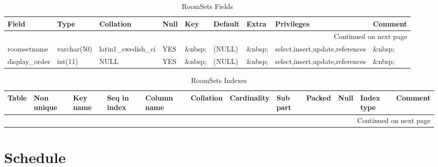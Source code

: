 \documentclass[tablesignature,landscape]{scrartcl}
\begin{document}
\begin{longtable}{|l|l|l|l|l|l|l|l|l|}
\caption{RoomSets Fields} \label{tbl:roomsetsfields}\\
\hline
 Field             &  Type         &  Collation                &  Null     &  Key      &  Default  &  Extra              &  Privileges                       &  Comment \\
\hline
\endhead
\hline\multicolumn{9}{r}{Continued on next page}\
\endfoot
\endlastfoot
\hline
 roomsetid         &  int(11)      &  NULL                     &  \&nbsp;  &  PRI      &  (NULL)   &  auto\_{}increment  &  select,insert,update,references  &  \&nbsp;  \\
 roomsetname       &  varchar(50)  &  latin1\_{}swedish\_{}ci  &  YES      &  \&nbsp;  &  (NULL)   &  \&nbsp;            &  select,insert,update,references  &  \&nbsp;  \\
 display\_{}order  &  int(11)      &  NULL                     &  YES      &  \&nbsp;  &  (NULL)   &  \&nbsp;            &  select,insert,update,references  &  \&nbsp;  \\
\hline
\end{longtable}


\begin{longtable}{|l|l|l|l|l|l|l|l|l|l|l|l|}
\caption{RoomSets Indexes} \label{tbl:roomsetsindexes}\\
\hline
 Table     &  Non unique  &  Key name  &  Seq in index  &  Column name  &  Collation  &  Cardinality  &  Sub part  &  Packed  &  Null     &  Index type  &  Comment \\
\hline
\endhead
\hline\multicolumn{12}{r}{Continued on next page}\
\endfoot
\endlastfoot
\hline
 RoomSets  &           0  &  PRIMARY   &             1  &  roomsetid    &  A          &           12  &  (NULL)    &  (NULL)  &  \&nbsp;  &  BTREE       &  \&nbsp;  \\
\hline
\end{longtable}
\section{Schedule}
\label{sec-24}
\end{document}
